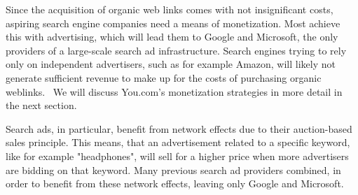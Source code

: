 \documentclass[5p,twocolumn,final]{elsarticle}
\begin{document}
Since the acquisition of organic web links comes with not insignificant costs, aspiring search engine companies need a means of monetization. Most achieve this with advertising, which will lead them to Google and Microsoft, the only providers of a large-scale search ad infrastructure. Search engines trying to rely only on independent advertisers, such as for example Amazon, will likely not generate sufficient revenue to make up for the costs of purchasing organic weblinks.~\cite{duckduckgo_whitepaper} We will discuss You.com's monetization strategies in more detail in the next section.\par
Search ads, in particular, benefit from network effects due to their auction-based sales principle. This means, that an advertisement related to a specific keyword, like for example "headphones", will sell for a higher price when more advertisers are bidding on that keyword. Many previous search ad providers combined, in order to benefit from these network effects, leaving only Google and Microsoft.~\cite{duckduckgo_whitepaper} \par
\end{document}
